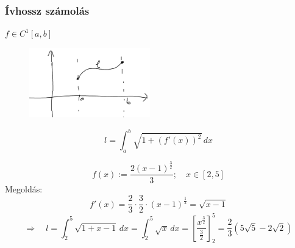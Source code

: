 \documentclass[a4paper,11.5pt]{article}
\begin{document}
	\subsubsection{Ívhossz számolás}
	\begin{note}
		$f\in C^1[a,b]$
		\begin{figure}[H]
			\centering
			\includegraphics[height=3cm]{kepek/11.png}
			\caption{}
		\end{figure}
		\vspace{-6mm}
		\[ l=\int_a^b\sqrt{1+(f'(x))^2}\,dx \]
	\end{note}
	\begin{example}
		\[ f(x):=\frac{2(x-1)^{\frac{3}{2}}}{3};\quad x\in[2,5] \]
		Megoldás:
		\[ f'(x)=\frac{2}{3}\cdot\frac{3}{2}\cdot(x-1)^\frac{1}{2}=\sqrt{x-1} \]
		\[ \Rightarrow\quad l=\int_2^5\sqrt{1+x-1}\,dx=\int_2^5\sqrt{x}\,dx=\left[\frac{x^\frac{3}{2}}{\frac{3}{2}}\right]_2^5=\frac{2}{3}\left(5\sqrt{5}-2\sqrt{2}\right) \]
	\end{example}
\end{document}
